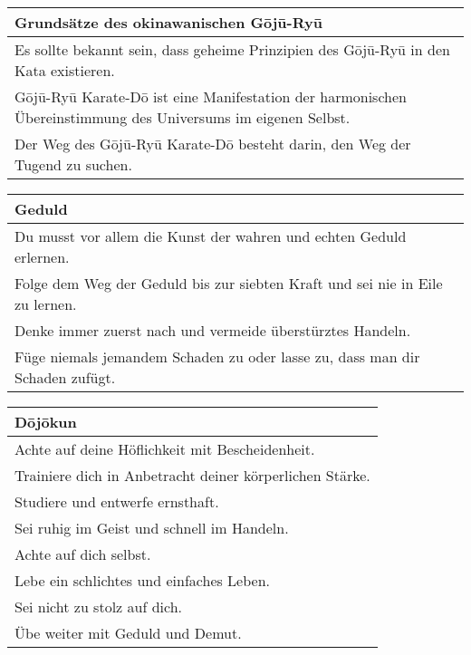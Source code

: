 \begin{tcolorbox}[width=\textwidth,height=\textheight,right=12pt,left=12pt,colframe=lightgray,colback=white,fonttitle=\bfseries,coltitle=black,title=Allgemeines:\indent Grundsätze und D\={o}j\={o}kun nach Miyagi Chojun]	
	\begin{footnotesize}
		\begin{tabularx}{\textwidth}{X}
			\textbf{Grundsätze des okinawanischen G\={o}j\={u}-Ry\={u}} \\
			\midrule
			Es sollte bekannt sein, dass geheime Prinzipien des G\={o}j\={u}-Ry\={u} in den Kata existieren. \\
			G\={o}j\={u}-Ry\={u} Karate-D\={o} ist eine Manifestation der harmonischen Übereinstimmung des Universums im eigenen Selbst. \\ 
			Der Weg des G\={o}j\={u}-Ry\={u} Karate-D\={o} besteht darin, den Weg der Tugend zu suchen.\\
		\end{tabularx}\null\vfill\null
		\begin{tabularx}{\textwidth}{X}	
			\textbf{Geduld}\\
			\midrule
			Du musst vor allem die Kunst der wahren und echten Geduld erlernen. \\
			Folge dem Weg der Geduld bis zur siebten Kraft und sei nie in Eile zu lernen. \\
			Denke immer zuerst nach und vermeide überstürztes Handeln. \\
			Füge niemals jemandem Schaden zu oder lasse zu, dass man dir Schaden zufügt. \\
		\end{tabularx}\null\vfill\null
		\begin{tabularx}{\textwidth}{X}	
			\textbf{D\={o}j\={o}kun}\\
			\midrule
			Achte auf deine Höflichkeit mit Bescheidenheit. \\
			Trainiere dich in Anbetracht deiner körperlichen Stärke. \\
			Studiere und entwerfe ernsthaft. \\
			Sei ruhig im Geist und schnell im Handeln. \\
			Achte auf dich selbst. \\
			Lebe ein schlichtes und einfaches Leben. \\
			Sei nicht zu stolz auf dich. \\
			Übe weiter mit Geduld und Demut. \\
		\end{tabularx}\null\vfill\null

\end{footnotesize}
\end{tcolorbox}
